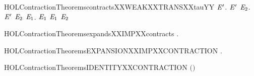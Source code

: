 \newcommand{\HOLContractionTheoremscontractsXXWEAKXXTRANSXXtau}{\UseVerbatim{HOLContractionTheoremscontractsXXWEAKXXTRANSXXtau}}
\begin{SaveVerbatim}{HOLContractionTheoremscontractsXXWEAKXXTRANSXXtauYY}
\HOLTokenTurnstile{} \HOLSymConst{\HOLTokenForall{}} \ensuremath{\HOLBoundVar{E}\sp{\prime{}}}.
       \ensuremath{\HOLBoundVar{E}\sp{\prime{}}} \HOLSymConst{\HOLTokenImp{}}
     \HOLSymConst{\HOLTokenForall{}} \ensuremath{\HOLBoundVar{E}\sb{\mathrm{2}}}. \ensuremath{\HOLBoundVar{E}\sp{\prime{}}} \HOLTokenWeakTransBegin\HOLConst{\ensuremath{\tau}}\HOLTokenWeakTransEnd \ensuremath{\HOLBoundVar{E}\sb{\mathrm{2}}} \HOLSymConst{\HOLTokenImp{}} \HOLSymConst{\HOLTokenExists{}}\ensuremath{\HOLBoundVar{E}\sb{\mathrm{1}}}.   \ensuremath{\HOLBoundVar{E}\sb{\mathrm{1}}} \HOLSymConst{\HOLTokenConj{}}  \ensuremath{\HOLBoundVar{E}\sb{\mathrm{1}}} \ensuremath{\HOLBoundVar{E}\sb{\mathrm{2}}}
\end{SaveVerbatim}
\newcommand{\HOLContractionTheoremscontractsXXWEAKXXTRANSXXtauYY}{\UseVerbatim{HOLContractionTheoremscontractsXXWEAKXXTRANSXXtauYY}}
\begin{SaveVerbatim}{HOLContractionTheoremsexpandsXXIMPXXcontracts}
\HOLTokenTurnstile{} \HOLSymConst{\HOLTokenForall{}} .    \HOLSymConst{\HOLTokenImp{}}   
\end{SaveVerbatim}
\newcommand{\HOLContractionTheoremsexpandsXXIMPXXcontracts}{\UseVerbatim{HOLContractionTheoremsexpandsXXIMPXXcontracts}}
\begin{SaveVerbatim}{HOLContractionTheoremsEXPANSIONXXIMPXXCONTRACTION}
\HOLTokenTurnstile{} \HOLSymConst{\HOLTokenForall{}}.   \HOLSymConst{\HOLTokenImp{}}  
\end{SaveVerbatim}
\newcommand{\HOLContractionTheoremsEXPANSIONXXIMPXXCONTRACTION}{\UseVerbatim{HOLContractionTheoremsEXPANSIONXXIMPXXCONTRACTION}}
\begin{SaveVerbatim}{HOLContractionTheoremsIDENTITYXXCONTRACTION}
\HOLTokenTurnstile{}  \ensuremath{(}\HOLSymConst{\ensuremath{=}}\ensuremath{)}
\end{SaveVerbatim}
\newcommand{\HOLContractionTheoremsIDENTITYXXCONTRACTION}{\UseVerbatim{HOLContractionTheoremsIDENTITYXXCONTRACTION}}
